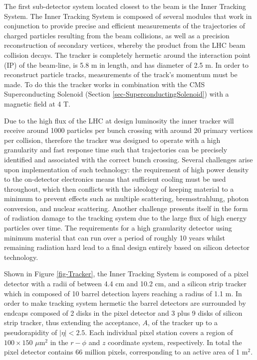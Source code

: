 The first sub-detector system located closest to the beam is the Inner Tracking System. The Inner Tracking System is composed of several modules that work in conjunction to provide precise and efficient measurements of the trajectories of charged particles resulting from the beam collisions, as well as a precision reconstruction of secondary vertices, whereby the product from the LHC beam collision decays. The tracker is completely hermetic around the interaction point (IP) of the beam-line, is 5.8 m in length, and has diameter of 2.5 m. In order to reconstruct particle tracks, measurements of the track's momentum must be made. To do this the tracker works in combination with the CMS Superconducting Solenoid (Section \ref{sec-SuperconductingSolenoid}) with a magnetic field at 4 T. 

Due to the high flux of the LHC at design luminosity the inner tracker will receive around 1000 particles per bunch crossing with around 20 primary vertices per collision, therefore the tracker was designed to operate with a high granularity and fast response time such that trajectories can be precisely identified and associated with the correct bunch crossing. Several challenges arise upon implementation of such technology: the requirement of high power density to the on-detector electronics means that sufficient cooling must be used throughout, which then conflicts with the ideology of keeping material to a minimum to prevent effects such as multiple scattering, bremsstrahlung, photon conversion, and nuclear scattering. Another challenge presents itself in the form of radiation damage to the tracking system due to the large flux of high energy particles over time. The requirements for a high granularity detector using minimum material that can run over a period of roughly 10 years whilst remaining radiation hard lead to a final design entirely based on silicon detector technology. 

Shown in Figure \ref{fig-Tracker}, the Inner Tracking System is composed of a pixel detector with a radii of between 4.4 cm and 10.2 cm, and a silicon strip tracker which in composed of 10 barrel detection layers reaching a radius of 1.1 m. In order to make tracking system hermetic the barrel detectors are surrounded by endcaps composed of 2 disks in the pixel detector and 3 plus 9 disks of silicon strip tracker, thus extending the acceptance, $A$, of the tracker up to a pseudorapidity of $|\eta| < 2.5$.  Each individual pixel station covers a region of $100\times150$ $\mu$m$^2$ in the $r-\phi$ and $z$ coordinate system, respectively. In total the pixel detector contains 66 million pixels, corresponding to an active area of 1 m$^2$.

